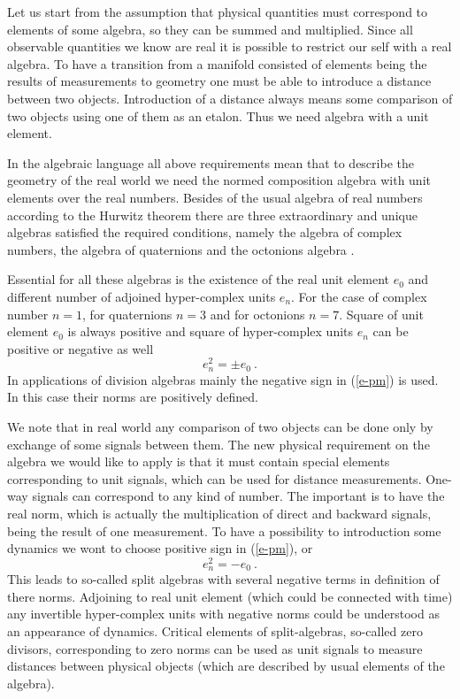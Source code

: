 \documentclass[a4paper,12pt]{article}
\begin{document}
Let us start from the assumption that physical quantities must correspond to 
elements of some algebra, so they can be summed and multiplied. Since all 
observable quantities we know are real it is possible to restrict our self with 
a real algebra. To have a transition from a manifold consisted of elements being 
the results of measurements to geometry one must be able to introduce a distance 
between two objects. Introduction of a distance always means some comparison of 
two objects using one of them as an etalon. Thus we need algebra with a unit 
element. 

In the algebraic language all above requirements mean that to describe the geometry 
of the real world we need the normed composition algebra with unit elements over 
the real numbers. Besides of the usual algebra of real numbers according to the 
Hurwitz theorem there are three extraordinary and unique algebras satisfied the 
required conditions, namely the algebra of complex numbers, the algebra of 
quaternions and the octonions algebra \cite{Sc}. 

Essential for all these algebras is the existence of the real unit element $e_0$ and 
different number of adjoined hyper-complex units $e_n$. For the case of complex number 
$n = 1$, for quaternions $n = 3$ and for octonions $n = 7$. Square of unit element 
$e_0$ is always positive and square of hyper-complex units $e_n$ can be positive or 
negative as well
\begin{equation} \label{e-pm}
e_n^2 = \pm e_0 ~.
\end{equation}
In applications of division algebras mainly the negative sign in (\ref{e-pm}) is used. 
In this case their norms are positively defined.

We note that in real world any comparison of two objects can be done only by exchange 
of some signals between them. The new physical requirement on the algebra we would 
like to apply is that it must contain special elements corresponding to unit signals, 
which can be used for distance measurements. One-way signals can correspond to any kind 
of number. The important is to have the real norm, which is actually the multiplication 
of direct and backward signals, being the result of one measurement. To have a 
possibility to introduction some dynamics we wont to choose positive sign in (\ref{e-pm}), 
or
\begin{equation} \label{e-}
e_n^2 = - e_0 ~.
\end{equation}
This leads to so-called split algebras with several negative terms in definition of 
there norms. Adjoining to real unit element (which could be connected with time) any 
invertible hyper-complex units with negative norms could be understood as an appearance 
of dynamics. Critical elements of split-algebras, so-called zero divisors, corresponding 
to zero norms can be used as unit signals to measure distances between physical objects 
(which are described by usual elements of the algebra).
\end{document}
